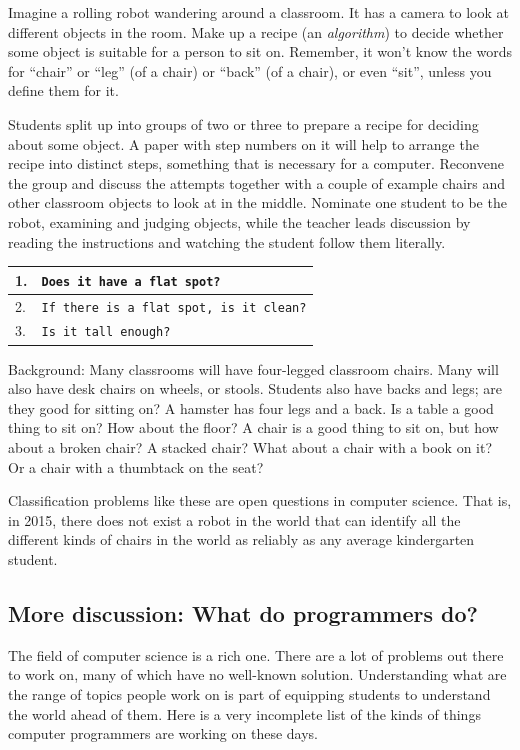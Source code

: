 \documentclass[11pt]{article}
\begin{document}
Imagine a rolling robot wandering around a classroom.  It
has a camera to look at different objects in the room.  Make up a
recipe (an \emph{algorithm}) to decide whether some object is suitable
for a person to sit on.  Remember, it won't know the words for
``chair'' or ``leg'' (of a chair) or ``back'' (of a chair), or even
``sit'', unless you define them for it.

Students split up into groups of two or three to prepare a recipe for
deciding about some object.  A paper with step numbers on it will help
to arrange the recipe into distinct steps, something that is necessary
for a computer.  Reconvene the group and discuss the attempts together
with a couple of example chairs and other classroom objects to look at
in the middle.  Nominate one student to be the robot, examining and
judging objects, while the teacher leads discussion by reading the
instructions and watching the student follow them literally.

\begin{center}
\begin{tabular}{|l|p{3in}} \hline
1. & {\tt Does it have a flat spot?} \\ \hline
2. & {\tt If there is a flat spot, is it clean?} \\ \hline
3. & {\tt Is it tall enough?}\\
\end{tabular}
\end{center}

Background: Many classrooms will have four-legged classroom chairs.
Many will also have desk chairs on wheels, or stools.  Students also
have backs and legs; are they good for sitting on?  A hamster has four
legs and a back.  Is a table a good thing to sit on?  How about the
floor?  A chair is a good thing to sit on, but how about a broken
chair?  A stacked chair?  What about a chair with a book on it?  Or a
chair with a thumbtack on the seat?

Classification problems like these are open questions in computer
science.  That is, in 2015, there does not exist a robot in the world
that can identify all the different kinds of chairs in the world as
reliably as any average kindergarten student.

\subsection{More discussion: What do programmers do?}

The field of computer science is a rich one.  There are a lot of
problems out there to work on, many of which have no well-known
solution.  Understanding what are the range of topics people work on
is part of equipping students to understand the world ahead of them.
Here is a very incomplete list of the kinds of things computer
programmers are working on these days.
\end{document}
